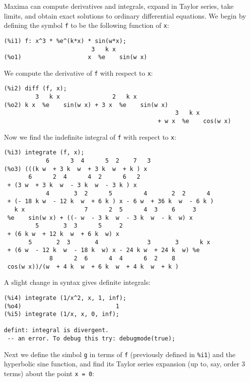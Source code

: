 \documentclass[a4paper,12pt]{article}
\begin{document}
Maxima can compute derivatives and integrals, expand in Taylor series,
take limits, and obtain exact solutions to ordinary differential
equations.  We begin by defining the symbol {\tt f} to be the
following function of {\tt x}:
\begin{verbatim}
(%i1) f: x^3 * %e^(k*x) * sin(w*x);
                         3   k x
(%o1)                   x  %e    sin(w x)
\end{verbatim}
We compute the derivative of {\tt f} with respect to {\tt x}:
\begin{verbatim}
(%i2) diff (f, x);
         3   k x               2   k x
(%o2) k x  %e    sin(w x) + 3 x  %e    sin(w x)
                                                 3   k x
                                            + w x  %e    cos(w x)
\end{verbatim}
Now we find the indefinite integral of {\tt f} with respect to {\tt x}:
\begin{verbatim}
(%i3) integrate (f, x);
            6      3  4      5  2    7   3
(%o3) (((k w  + 3 k  w  + 3 k  w  + k ) x
       6      2  4      4  2      6   2
 + (3 w  + 3 k  w  - 3 k  w  - 3 k ) x
            4       3  2      5         4       2  2      4
 + (- 18 k w  - 12 k  w  + 6 k ) x - 6 w  + 36 k  w  - 6 k )
   k x                 7      2  5      4  3    6     3
 %e    sin(w x) + ((- w  - 3 k  w  - 3 k  w  - k  w) x
         5       3  3      5     2
 + (6 k w  + 12 k  w  + 6 k  w) x
       5       2  3       4              3       3      k x
 + (6 w  - 12 k  w  - 18 k  w) x - 24 k w  + 24 k  w) %e
             8      2  6      4  4      6  2    8
 cos(w x))/(w  + 4 k  w  + 6 k  w  + 4 k  w  + k )
\end{verbatim}
A slight change in syntax gives definite integrals:
\begin{verbatim}
(%i4) integrate (1/x^2, x, 1, inf);
(%o4)                           1
(%i5) integrate (1/x, x, 0, inf);

defint: integral is divergent.
 -- an error. To debug this try: debugmode(true);
\end{verbatim}
Next we define the simbol {\tt g} in terms of {\tt f} (previously
defined in {\tt \%i1}) and the hyperbolic sine function, and find its
Taylor series expansion (up to, say, order 3 terms) about the point
{\tt x = 0}:
\end{document}
